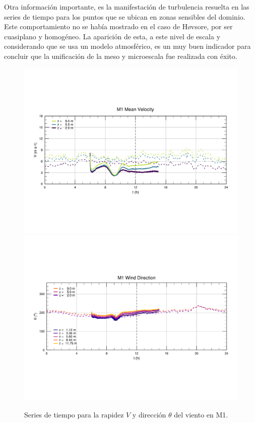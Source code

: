 Otra información importante, es la manifestación de turbulencia resuelta en las series de tiempo para los puntos que se ubican en zonas sensibles del dominio. Este comportamiento no se había mostrado en el caso de Høvsore, por ser cuasiplano y homogéneo. La aparición de esta, a este nivel de escala y considerando que se usa un modelo atmosférico, es un muy buen indicador para concluir que la unificación de la meso y microescala fue realizada con éxito.

\newpage
\vspace*{\fill}
\begin{figure}[H]
	\centering
	\includegraphics[width=0.87\linewidth,page=1,trim={9mm 57mm 10mm 60mm},clip]{Imagenes/06/bol/ts_interpol_compare.pdf}\\%
	\includegraphics[width=0.87\linewidth,page=1,trim={12mm 52mm 10mm 60mm},clip]{Imagenes/06/bol/ts_interpol_compare_o.pdf}%
	\vspace{-2mm}\caption{Series de tiempo para la rapidez $V$ y dirección $\theta$ del viento en M1.}
	\label{fig:06_bol_ts_m1}
\end{figure}
